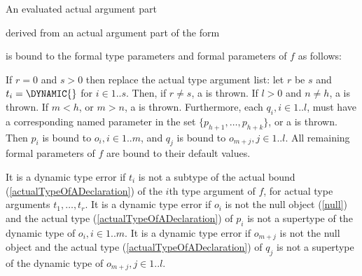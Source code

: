 \documentclass[makeidx]{article}
\begin{document}
{\LMHash{}%
An evaluated actual argument part


\noindent
derived from an actual argument part of the form


\noindent
is bound to the formal type parameters and formal parameters of $f$ as follows:

\LMHash{}%
If $r = 0$ and $s > 0$ then replace the actual type argument list:
let $r$ be $s$ and $t_i = \DYNAMIC{}$ for $i \in 1 .. s$.
Then, if $r \not= s$, a  is thrown.
If $l > 0$ and $n \not= h$, a  is thrown.
If $m < h$, or $m > n$, a  is thrown.
Furthermore, each
$q_i, i \in 1 .. l$,
must have a corresponding named parameter in the set
$\{p_{h+1}, \ldots, p_{h+k}\}$,
or a  is thrown.
Then $p_i$ is bound to
$o_i, i \in 1 .. m$,
and $q_j$ is bound to $o_{m+j}, j \in 1 .. l$.
All remaining formal parameters of $f$ are bound to their default values.


\LMHash{}%
It is a dynamic type error if $t_i$ is not a subtype of the actual bound
(\ref{actualTypeOfADeclaration})
of the $i$th type argument of $f$, for actual type arguments $t_1, \ldots, t_r$.
It is a dynamic type error if $o_i$ is not the null object (\ref{null})
and the actual type
(\ref{actualTypeOfADeclaration})
of $p_i$ is not a supertype of the dynamic type of $o_i, i \in 1 .. m$.
It is a dynamic type error if $o_{m+j}$ is
not the null object and the actual type
(\ref{actualTypeOfADeclaration})
of $q_j$ is not a supertype of the dynamic type of $o_{m+j}, j \in 1 .. l$.


}
\end{document}
